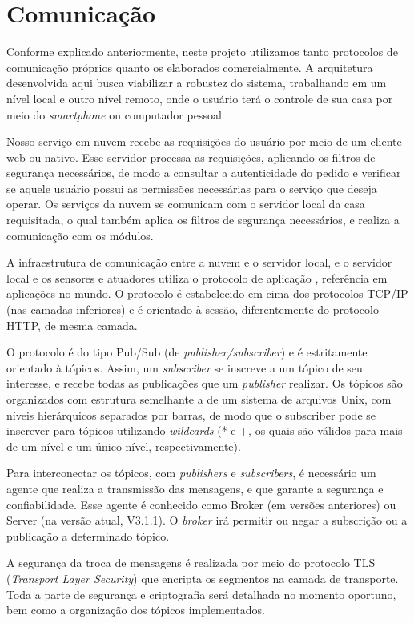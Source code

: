\section{Comunicação}
Conforme explicado anteriormente, neste projeto utilizamos tanto protocolos de comunicação próprios quanto os elaborados comercialmente. A arquitetura desenvolvida aqui busca viabilizar a robustez do sistema, trabalhando em um nível local e outro nível remoto, onde o usuário terá o controle de sua casa por meio do \textit{smartphone} ou computador pessoal.

Nosso serviço em nuvem recebe as requisições do usuário por meio de um cliente web ou nativo. Esse servidor processa as requisições, aplicando os filtros de segurança necessários, de modo a consultar a autenticidade do pedido e verificar se aquele usuário possui as permissões necessárias para o serviço que deseja operar. Os serviços da nuvem se comunicam com o servidor local da casa requisitada, o qual também aplica os filtros de segurança necessários, e realiza a comunicação com os módulos.

A infraestrutura de comunicação entre a nuvem e o servidor local, e o servidor local e os sensores e atuadores utiliza o protocolo de aplicação \wmqtt{}, referência em aplicações \wiot{} no mundo. O protocolo \wmqtt{} é estabelecido em cima dos protocolos TCP/IP (nas camadas inferiores) e é orientado à sessão, diferentemente do protocolo HTTP, de mesma camada.

O protocolo \wmqtt{} é do tipo Pub/Sub (de \textit{publisher/subscriber}) e é estritamente orientado à tópicos. Assim, um \textit{subscriber} se inscreve a um tópico de seu interesse, e recebe todas as publicações que um \textit{publisher} realizar. Os tópicos são organizados com estrutura semelhante a de um sistema de arquivos Unix, com níveis hierárquicos separados por barras, de modo que o subscriber pode se inscrever para tópicos utilizando \textit{wildcards} (* e +, os quais são válidos para mais de um nível e um único nível, respectivamente).

Para interconectar os tópicos, com \textit{publishers} e \textit{subscribers}, é necessário um agente que realiza a transmissão das mensagens, e que garante a segurança e confiabilidade. Esse agente é conhecido como Broker (em versões anteriores) ou Server (na versão atual, V3.1.1). O \textit{broker} irá permitir ou negar a subscrição ou a publicação a determinado tópico.

A segurança da troca de mensagens é realizada por meio do protocolo TLS (\textit{Transport Layer Security}) que encripta os segmentos na camada de transporte. Toda a parte de segurança e criptografia será detalhada no momento oportuno, bem como a organização dos tópicos implementados. %

